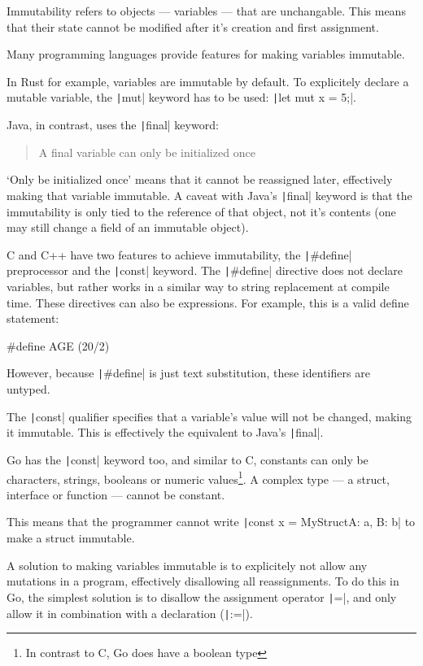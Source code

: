 Immutability refers to objects --- variables --- that are unchangable. This means
that their state cannot be modified after it's creation and first assignment.

Many programming languages provide features for making variables immutable.

In Rust for example, variables are immutable by default. To explicitely declare
a mutable variable, the \texttt|mut| keyword has to be used: \texttt|let mut x = 5;|.

Java, in contrast, uses the \texttt|final| keyword:
\begin{quote}
    A final variable can only be initialized once\autocite{final-java}
\end{quote}
`Only be initialized once' means that it cannot be reassigned later, effectively
making that variable immutable.
A caveat with Java's \texttt|final| keyword is that the immutability
is only tied to the reference of that object, not
it's contents (one may still change a field of an immutable object).

C and C++ have two features to achieve immutability, the \texttt|#define|
preprocessor and the \texttt|const| keyword.
The \texttt|#define| directive does not declare variables, but rather
works in a similar way to string replacement at compile time. These directives
can also be expressions. For example, this is a valid define statement:
\begin{ccode}
#define AGE (20/2)
\end{ccode}

However, because \texttt|#define| is just text substitution, these
identifiers are untyped.

The \texttt|const| qualifier specifies that a variable's value
will not be changed, making it immutable. This is effectively the equivalent
to Java's \texttt|final|.

Go has the \texttt|const| keyword too, and similar to C, constants can only be
characters, strings, booleans or numeric values\footnote{In contrast to C, Go does
have a boolean type}. A complex type --- a struct, interface or function --- cannot be constant.

This means that the programmer cannot write
\texttt|const x = MyStruct{A: a, B: b}| to make a struct immutable.

A solution to making variables
immutable is to explicitely not allow any mutations in a program, effectively
disallowing all reassignments.
To do this in Go, the simplest solution is
to disallow the assignment operator \texttt|=|, and only
allow it in combination with a declaration (\texttt|:=|).

